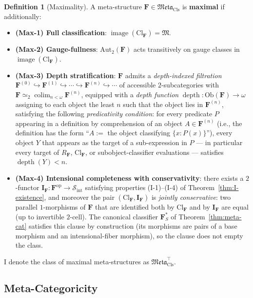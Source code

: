 \documentclass[11pt]{article}
\theoremstyle{plain}
\theoremstyle{definition}
\newtheorem{definition}[theorem]{Definition}
\newcommand{\cS}{\mathcal{S}}
\newcommand{\fM}{\mathfrak{M}}
\newcommand{\Meta}{\mathfrak{Meta}}
\newcommand{\Sint}{\cS_{\mathrm{int}}}
\newcommand{\Ob}{\mathrm{Ob}}
\newcommand{\Cl}{\mathrm{Cl}}
\newcommand{\II}{\mathbf{I}}
\DeclareMathOperator{\colim}{colim}
\DeclareMathOperator{\image}{image}
\DeclareMathOperator{\dep}{depth}
\begin{document}
\begin{definition}[Maximality]\label{def:maximality}
A meta-structure $\mathbf{F} \in \Meta_{\mathrm{Cls}}$ is \textbf{maximal} if additionally:
\begin{itemize}
\item \textbf{(Max-1) Full classification}: $\image(\Cl_{\mathbf{F}}) = \fM$.
\item \textbf{(Max-2) Gauge-fullness}: $\mathrm{Aut}_2(\mathbf{F})$ acts transitively on gauge classes in $\image(\Cl_{\mathbf{F}})$.
\item \textbf{(Max-3) Depth stratification}: $\mathbf{F}$ admits a \emph{depth-indexed filtration} $\mathbf{F}^{(0)} \hookrightarrow \mathbf{F}^{(1)} \hookrightarrow \cdots \hookrightarrow \mathbf{F}^{(n)} \hookrightarrow \cdots$ of accessible $2$-subcategories with $\mathbf{F} \simeq_2 \colim_{n < \omega} \mathbf{F}^{(n)}$, equipped with a \emph{depth function} $\dep : \Ob(\mathbf{F}) \to \omega$ assigning to each object the least $n$ such that the object lies in $\mathbf{F}^{(n)}$, satisfying the following \emph{predicativity condition}: for every predicate $P$ appearing in a definition by comprehension of an object $A \in \mathbf{F}^{(n)}$ (i.e., the definition has the form ``$A :=$ the object classifying $\{x : P(x)\}$''), every object $Y$ that appears as the target of a sub-expression in $P$ --- in particular every target of $R_\mathbf{F}$, $\Cl_\mathbf{F}$, or subobject-classifier evaluations --- satisfies $\dep(Y) < n$.
\item \textbf{(Max-4) Intensional completeness with conservativity}: there exists a $2$-functor $\II_{\mathbf{F}} : \mathbf{F}^{\mathrm{op}} \to \Sint$ satisfying properties (I-1)--(I-4) of Theorem~\ref{thm:I-existence}, and moreover the pair $(\Cl_{\mathbf{F}}, \II_{\mathbf{F}})$ is \emph{jointly conservative}: two parallel $1$-morphisms of $\mathbf{F}$ that are identified both by $\Cl_{\mathbf{F}}$ and by $\II_{\mathbf{F}}$ are equal (up to invertible $2$-cell). The canonical classifier $\mathbf{F}_S^*$ of Theorem~\ref{thm:meta-cat} satisfies this clause by construction (its morphisms are pairs of a base morphism and an intensional-fiber morphism), so the clause does not empty the class.
\end{itemize}
I denote the class of maximal meta-structures as $\Meta_{\mathrm{Cls}}^{\top}$.
\end{definition}

\subsection{Meta-Categoricity}
\end{document}
